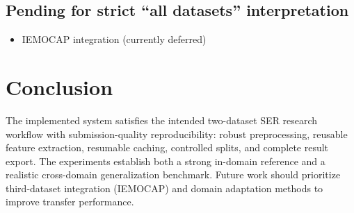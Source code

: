 \documentclass[11pt,a4paper]{article}
\begin{document}
\subsection{Pending for strict ``all datasets'' interpretation}
\begin{itemize}
    \item IEMOCAP integration (currently deferred)
\end{itemize}

\section{Conclusion}
The implemented system satisfies the intended two-dataset SER research workflow with submission-quality reproducibility: robust preprocessing, reusable feature extraction, resumable caching, controlled splits, and complete result export. The experiments establish both a strong in-domain reference and a realistic cross-domain generalization benchmark. Future work should prioritize third-dataset integration (IEMOCAP) and domain adaptation methods to improve transfer performance.
\end{document}
